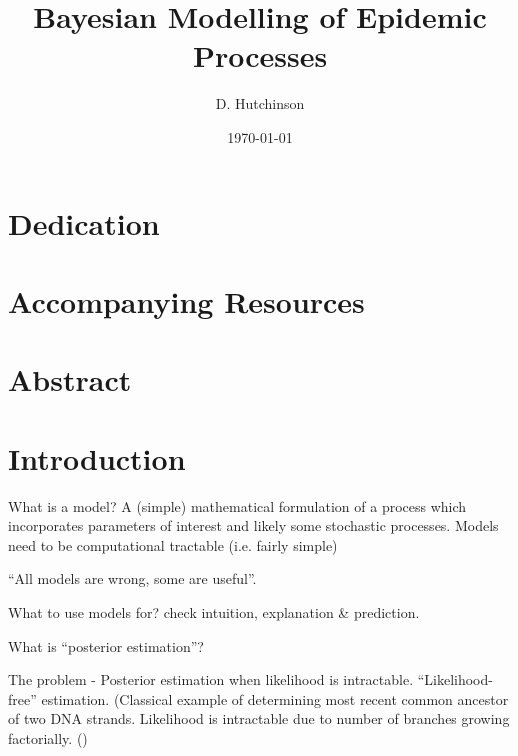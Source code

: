 \documentclass[11pt,a4paper]{article}
\theoremstyle{break}
\begin{document}
\title{Bayesian Modelling of Epidemic Processes}
\author{D. Hutchinson}
\date{\today}
\clearpage\maketitle
\thispagestyle{empty}

\newpage
\setcounter{page}{1}

\section*{Dedication}\label{sec_dedication}

\section*{Accompanying Resources}\label{sec_accompanying_resources}

\newpage
\section*{Abstract}\label{sec_abstract}

\newpage
\tableofcontents

\newpage
{}
\setcounter{page}{1}
\section{Introduction}\label{sec_introduction}

  \par What is a model? A (simple) mathematical formulation of a process which incorporates parameters of interest and likely some stochastic processes. Models need to be computational tractable (i.e. fairly simple)
  \par ``All models are wrong, some are useful''.
  \par What to use models for? check intuition, explanation \& prediction.
  \par What is ``posterior estimation''?
  \par The problem - Posterior estimation when likelihood is intractable. ``Likelihood-free'' estimation. (Classical example of determining most recent common ancestor of two DNA strands. Likelihood is intractable due to number of branches growing factorially. (\cite[]{selecting_summary_stats_in_ABC_for_calibration})
\end{document}
